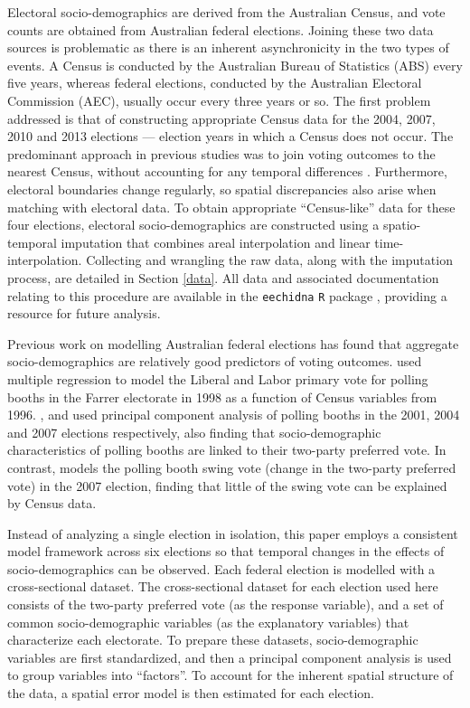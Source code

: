 \documentclass[times, doublespace]{anzsauth}
\begin{document}
Electoral socio-demographics are derived from the Australian Census, and vote counts are obtained from Australian federal elections. Joining these two data sources is problematic as there is an inherent asynchronicity in the two types of events. A Census is conducted by the Australian Bureau of Statistics (ABS) every five years, whereas federal elections, conducted by the Australian Electoral Commission (AEC), usually occur every three years or so. The first problem addressed is that of constructing appropriate Census data for the 2004, 2007, 2010 and 2013 elections --- election years in which a Census does not occur. The predominant approach in previous studies was to join voting outcomes to the nearest Census, without accounting for any temporal differences \citep[see][]{DavisStimson98, Stimson06, Liao09, Stimson09}. Furthermore, electoral boundaries change regularly, so spatial discrepancies also arise when matching with electoral data. To obtain appropriate ``Census-like'' data for these four elections, electoral socio-demographics are constructed using a spatio-temporal imputation that combines areal interpolation \citep{Goodchild1993} and linear time-interpolation. Collecting and wrangling the raw data, along with the imputation process, are detailed in Section \ref{data}. All data and associated documentation relating to this procedure are available in the \texttt{eechidna} \texttt{R} package \citep{eechidna}, providing a resource for future analysis.

Previous work on modelling Australian federal elections has found that aggregate socio-demographics are relatively good predictors of voting outcomes. \citet{Forrest01} used multiple regression to model the Liberal and Labor primary vote for polling booths in the Farrer electorate in 1998 as a function of Census variables from 1996. \citet{Stimson06}, \citet{Stimson09} and \citet{Stimson12} used principal component analysis of polling booths in the 2001, 2004 and 2007 elections respectively, also finding that socio-demographic characteristics of polling booths are linked to their two-party preferred vote. In contrast, \citet{Stimson09} models the polling booth swing vote (change in the two-party preferred vote) in the 2007 election, finding that little of the swing vote can be explained by Census data.

Instead of analyzing a single election in isolation, this paper employs a consistent model framework across six elections so that temporal changes in the effects of socio-demographics can be observed. Each federal election is modelled with a cross-sectional dataset.
The cross-sectional dataset for each election used here consists of the two-party preferred vote (as the response variable), and a set of common socio-demographic variables (as the explanatory variables) that characterize each electorate. To prepare these datasets, socio-demographic variables are first standardized, and then a principal component analysis is used to group variables into ``factors''. To account for the inherent spatial structure of the data, a spatial error model is then estimated for each election.
\end{document}
